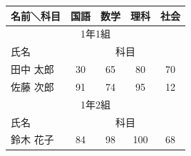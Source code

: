 \documentclass{ltjsarticle}
\begin{document}
\begin{table}[htbp]
  \begin{tabular}{|l||c|c|c|c|}
    \hline
    名前＼科目 & 国語 & 数学 & 理科 & 社会 \\
    \hline \hline
    \multicolumn{5}{|c|}{1年1組}\\
    \hline
    氏名 & \multicolumn{4}{|c|}{科目} \\
    \hline
    田中 太郎 & 30 & 65 & 80 & 70 \\
    \hline
    佐藤 次郎 & 91 & 74 & 95 & 12 \\
    \hline
    \multicolumn{5}{|c|}{1年2組}\\
    \hline
    氏名 & \multicolumn{4}{|c|}{科目}\\
    \hline
    鈴木 花子 & 84 & 98 & 100 & 68 \\
    \hline
  \end{tabular}
\end{table}
\end{document}
